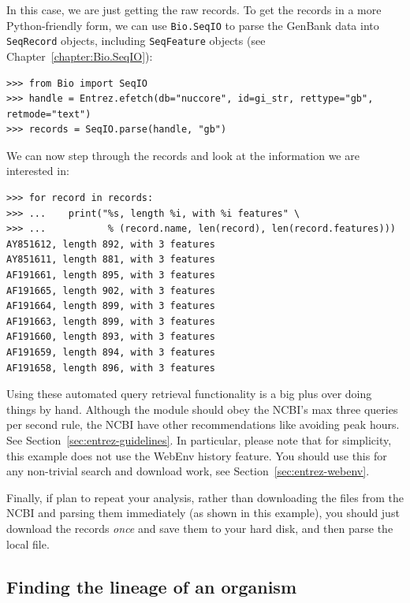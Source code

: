 \documentclass{report}
\begin{document}
In this case, we are just getting the raw records. To get the records in a more Python-friendly form, we can use \verb+Bio.SeqIO+ to parse the GenBank data into \verb|SeqRecord| objects, including \verb|SeqFeature| objects (see Chapter~\ref{chapter:Bio.SeqIO}):

\begin{verbatim}
>>> from Bio import SeqIO
>>> handle = Entrez.efetch(db="nuccore", id=gi_str, rettype="gb", retmode="text")
>>> records = SeqIO.parse(handle, "gb")
\end{verbatim}

\noindent We can now step through the records and look at the information we are interested in:
\begin{verbatim}
>>> for record in records: 
>>> ...    print("%s, length %i, with %i features" \
>>> ...           % (record.name, len(record), len(record.features)))
AY851612, length 892, with 3 features
AY851611, length 881, with 3 features
AF191661, length 895, with 3 features
AF191665, length 902, with 3 features
AF191664, length 899, with 3 features
AF191663, length 899, with 3 features
AF191660, length 893, with 3 features
AF191659, length 894, with 3 features
AF191658, length 896, with 3 features
\end{verbatim}

Using these automated query retrieval functionality is a big plus over doing things by hand.   Although the module should obey the NCBI's max three queries per second rule, the NCBI have other recommendations like avoiding peak hours.  See Section~\ref{sec:entrez-guidelines}.
In particular, please note that for simplicity, this example does not use the WebEnv history feature.  You should use this for any non-trivial search and download work, see Section~\ref{sec:entrez-webenv}.

Finally, if plan to repeat your analysis, rather than downloading the files from the NCBI and parsing them immediately (as shown in this example), you should just download the records \emph{once} and save them to your hard disk, and then parse the local file.

\subsection{Finding the lineage of an organism}
\end{document}
